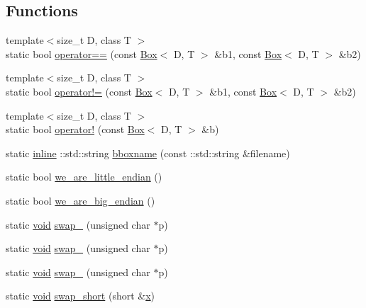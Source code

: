 \subsection*{Functions}
\begin{DoxyCompactItemize}
\item 
{\footnotesize template$<$size\+\_\+t D, class T $>$ }\\static bool \hyperlink{namespacetrimesh_a86d58b3eb5fb30b3e4a2f877c80121d7}{operator==} (const \hyperlink{classtrimesh_1_1Box}{Box}$<$ D, T $>$ \&b1, const \hyperlink{classtrimesh_1_1Box}{Box}$<$ D, T $>$ \&b2)
\item 
{\footnotesize template$<$size\+\_\+t D, class T $>$ }\\static bool \hyperlink{namespacetrimesh_a8c828bc153a668d172ff22788f17d5a9}{operator!=} (const \hyperlink{classtrimesh_1_1Box}{Box}$<$ D, T $>$ \&b1, const \hyperlink{classtrimesh_1_1Box}{Box}$<$ D, T $>$ \&b2)
\item 
{\footnotesize template$<$size\+\_\+t D, class T $>$ }\\static bool \hyperlink{namespacetrimesh_af767195cb37f08a930059365eb736329}{operator!} (const \hyperlink{classtrimesh_1_1Box}{Box}$<$ D, T $>$ \&b)
\item 
static \hyperlink{XForm_8h_a00d24c7231be28dbaf71f5408f30e44c}{inline} \+::std\+::string \hyperlink{namespacetrimesh_a347e2f66e5bae546671794bf1df500d0}{bboxname} (const \+::std\+::string \&filename)
\item 
static bool \hyperlink{namespacetrimesh_a1b46ad9009f2ad07c2b89bf1543ab9d0}{we\+\_\+are\+\_\+little\+\_\+endian} ()
\item 
static bool \hyperlink{namespacetrimesh_a5f014f93115b2ad19a671963155db453}{we\+\_\+are\+\_\+big\+\_\+endian} ()
\item 
static \hyperlink{namespacetrimesh_a784ddfd979e1c579bda795a8edfc3f43}{void} \hyperlink{namespacetrimesh_a604fb80fb02cb269a09340efecce38bc}{swap\+\_} (unsigned char $\ast$p)
\item 
static \hyperlink{namespacetrimesh_a784ddfd979e1c579bda795a8edfc3f43}{void} \hyperlink{namespacetrimesh_ac0a8af760ad9653bed2fba73017582d2}{swap\+\_} (unsigned char $\ast$p)
\item 
static \hyperlink{namespacetrimesh_a784ddfd979e1c579bda795a8edfc3f43}{void} \hyperlink{namespacetrimesh_adc950fdeb642770e3588340efe3e5a91}{swap\+\_} (unsigned char $\ast$p)
\item 
static \hyperlink{namespacetrimesh_a784ddfd979e1c579bda795a8edfc3f43}{void} \hyperlink{namespacetrimesh_ae4885974cd480eeb0bb63a3595eef4fd}{swap\+\_\+short} (short \&\hyperlink{namespacetrimesh_a3365d1b1a1bc5d8e9c844cf589a8c4a8}{x})

\end{DoxyCompactItemize}

